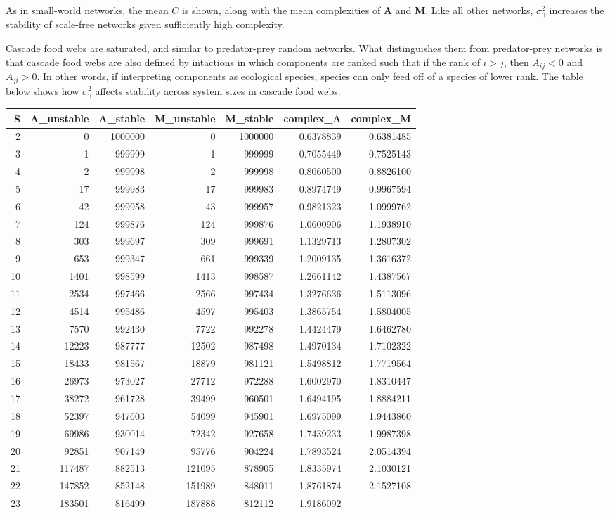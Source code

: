 \documentclass[]{article}
\begin{document}
As in small-world networks, the mean \(C\) is shown, along with the mean
complexities of \(\mathbf{A}\) and \(\mathbf{M}\). Like all other
networks, \(\sigma^{2}_\gamma\) increases the stability of scale-free
networks given sufficiently high complexity.

Cascade food webs are saturated, and similar to predator-prey random
networks. What distinguishes them from predator-prey networks is that
cascade food webs are also defined by intactions in which components are
ranked such that if the rank of \(i > j\), then \(A_{ij} < 0\) and
\(A_{ji} > 0\). In other words, if interpreting components as ecological
species, species can only feed off of a species of lower rank. The table
below shows how \(\sigma^{2}_\gamma\) affects stability across system
sizes in cascade food webs.

\begin{longtable}[]{@{}rrrrrrr@{}}
\toprule
S & A\_unstable & A\_stable & M\_unstable & M\_stable & complex\_A &
complex\_M\tabularnewline
\midrule
\endhead
2 & 0 & 1000000 & 0 & 1000000 & 0.6378839 & 0.6381485\tabularnewline
3 & 1 & 999999 & 1 & 999999 & 0.7055449 & 0.7525143\tabularnewline
4 & 2 & 999998 & 2 & 999998 & 0.8060500 & 0.8826100\tabularnewline
5 & 17 & 999983 & 17 & 999983 & 0.8974749 & 0.9967594\tabularnewline
6 & 42 & 999958 & 43 & 999957 & 0.9821323 & 1.0999762\tabularnewline
7 & 124 & 999876 & 124 & 999876 & 1.0600906 & 1.1938910\tabularnewline
8 & 303 & 999697 & 309 & 999691 & 1.1329713 & 1.2807302\tabularnewline
9 & 653 & 999347 & 661 & 999339 & 1.2009135 & 1.3616372\tabularnewline
10 & 1401 & 998599 & 1413 & 998587 & 1.2661142 &
1.4387567\tabularnewline
11 & 2534 & 997466 & 2566 & 997434 & 1.3276636 &
1.5113096\tabularnewline
12 & 4514 & 995486 & 4597 & 995403 & 1.3865754 &
1.5804005\tabularnewline
13 & 7570 & 992430 & 7722 & 992278 & 1.4424479 &
1.6462780\tabularnewline
14 & 12223 & 987777 & 12502 & 987498 & 1.4970134 &
1.7102322\tabularnewline
15 & 18433 & 981567 & 18879 & 981121 & 1.5498812 &
1.7719564\tabularnewline
16 & 26973 & 973027 & 27712 & 972288 & 1.6002970 &
1.8310447\tabularnewline
17 & 38272 & 961728 & 39499 & 960501 & 1.6494195 &
1.8884211\tabularnewline
18 & 52397 & 947603 & 54099 & 945901 & 1.6975099 &
1.9443860\tabularnewline
19 & 69986 & 930014 & 72342 & 927658 & 1.7439233 &
1.9987398\tabularnewline
20 & 92851 & 907149 & 95776 & 904224 & 1.7893524 &
2.0514394\tabularnewline
21 & 117487 & 882513 & 121095 & 878905 & 1.8335974 &
2.1030121\tabularnewline
22 & 147852 & 852148 & 151989 & 848011 & 1.8761874 &
2.1527108\tabularnewline
23 & 183501 & 816499 & 187888 & 812112 & 1.9186092 &

\end{longtable}
\end{document}
